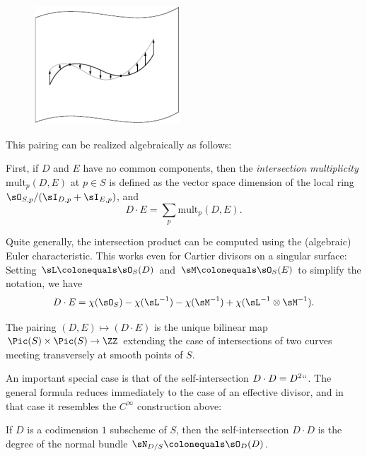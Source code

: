 \begin{figure}   %
\Small
\centerline{\includegraphics[height=1.75in]{"main/Fig02-strip"}%
%
%
}
\label{vanishing of normal vector field}
\end{figure}

This pairing can be realized algebraically as follows:

First, if $D$ and $E$ have no common
%
components, then the \emph{intersection multiplicity} 
$\mathrm{mult}_{p}(D,E)$ at $p\in S$
is defined as the vector space dimension of the local ring $\sO_{S,p}/(\sI_{D,p}+\sI_{E,p})$, and 
$$
D\cdot E = \sum_p \mathrm{mult}_{p}(D,E).
$$

Quite generally, 
the intersection product can be computed using the (algebraic) Euler
characteristic. 
This
works even for 
Cartier divisors
on a singular surface: Setting $\sL \colonequals \sO_S(D)$ and
%
%
$\sM \colonequals \sO_S(E)$ to simplify the notation, we have 
$$
D\cdot E = \chi(\sO_S)-\chi(\sL^{-1}) -\chi(\sM^{-1}) +\chi(\sL^{-1}\otimes \sM^{-1}) 
.
$$

\begin{theorem} The pairing $(D,E) \mapsto (D\cdot E)$ is the unique bilinear map
$\Pic(S) \times \Pic(S) \to \ZZ$ extending the case of intersections of two curves meeting transversely at smooth points of $S$. 
\end{theorem}

An important special case is that of the self-intersection $D\cdot D = D^2` `$. The general formula reduces immediately to the case of an effective divisor, and in that case it resembles the $C^{\infty}$ construction above:

\begin{corollary}\label{self-intersection number}
If $D$ is a codimension $1$ subscheme of $S$, then the self-intersection $D\cdot D$ is the degree of the normal bundle
$\sN_{D/S} \colonequals \sO_{D}(D)$.
\end{corollary}


